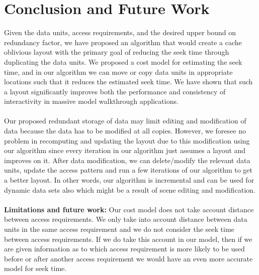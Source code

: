
\section{Conclusion and Future Work}

Given the data units, access requirements, and the desired upper bound on
redundancy factor, we have proposed an algorithm that would create a cache
oblivious layout with the primary goal of reducing the seek time through
duplicating the data units. We proposed a cost model for estimating the seek
time, and in our algorithm we can move or copy data units in appropriate
locations such that it reduces the estimated seek time.  We have shown that
such a layout significantly improves both the performance and consistency of
interactivity in massive model walkthrough applications.  \\ \\
Our proposed redundant storage of data may limit editing and modification of data because the data has to be modified at all copies. However, we foresee no problem in recomputing and updating the layout due to this modification using our algorithm since every iteration in our algorithm just assumes a layout and improves on it. After data modification, we can delete/modify the relevant data units, update the access pattern and run a few iterations of our algorithm to get a better layout. In other words, our algorithm is incremental and can be used for dynamic data sets also which might be a result of scene editing and modification.\\
\\
{\bf Limitations and future work:}
Our cost model does not take account distance between access requirements. We only take into account distance between data units in the same access requirement and we do not consider the seek time between access requirements. If we do take this account in our model, then if we are given information as to which access requirement is more likely to be used before or after another access requirement we would have an even more accurate model for seek time.

